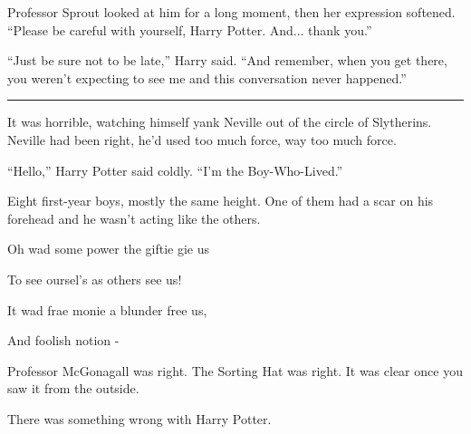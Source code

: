 Professor Sprout looked at him for a long moment, then her expression
softened. ``Please be careful with yourself, Harry Potter. And...
thank you.''

``Just be sure not to be late,'' Harry said. ``And remember, when you
get there, you weren't expecting to see me and this conversation never
happened.''

\begin{center}\rule{3in}{0.4pt}\end{center}

It was horrible, watching himself yank Neville out of the circle of
Slytherins. Neville had been right, he'd used too much force, way too
much force.

``Hello,'' Harry Potter said coldly. ``I'm the Boy-Who-Lived.''

Eight first-year boys, mostly the same height. One of them had a scar on
his forehead and he wasn't acting like the others.

Oh wad some power the giftie gie us

To see oursel's as others see us!

It wad frae monie a blunder free us,

And foolish notion -

Professor McGonagall was right. The Sorting Hat was right. It was clear
once you saw it from the outside.

There was something wrong with Harry Potter.

